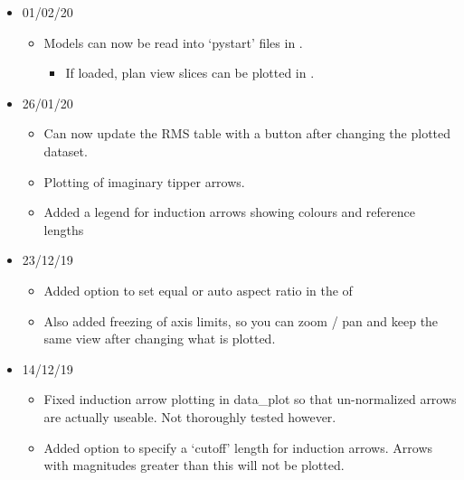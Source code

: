 \documentclass[letterpaper,10pt,english]{sphinxmanual}
\begin{document}
\begin{itemize}
\item {} 
01/02/20
\begin{itemize}
\item {} 
Models can now be read into ‘pystart’ files in {\hyperref[\detokenize{content/data_plot/main_window:data-plot}]{}}.
\begin{itemize}
\item {} 
If loaded, plan view slices can be plotted in .

\end{itemize}

\end{itemize}

\item {} 
26/01/20
\begin{itemize}
\item {} 
Can now update the RMS table with a button after changing the plotted dataset.

\item {} 
Plotting of imaginary tipper arrows.

\item {} 
Added a legend for induction arrows showing colours and reference lengths

\end{itemize}

\item {} 
23/12/19
\begin{itemize}
\item {} 
Added option to set equal or auto aspect ratio in the {\hyperref[\detokenize{content/data_plot/map_viewer:map-window}]{}} of {\hyperref[\detokenize{content/data_plot/main_window:data-plot}]{}}

\item {} 
Also added freezing of axis limits, so you can zoom / pan and keep the same view after changing what is plotted.

\end{itemize}

\item {} 
14/12/19
\begin{itemize}
\item {} 
Fixed induction arrow plotting in data\_plot so that un-normalized arrows are actually useable. Not thoroughly tested however.

\item {} 
Added option to specify a ‘cutoff’ length for induction arrows. Arrows with magnitudes greater than this will not be plotted.


\end{itemize}
\end{itemize}
\end{document}
